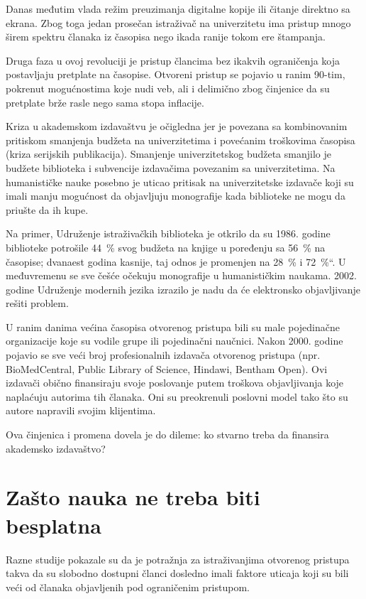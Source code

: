 \documentclass[12pt,a4paper]{article}
\begin{document}
   Danas međutim vlada režim preuzimanja digitalne kopije ili čitanje direktno sa ekrana. Zbog toga jedan prosečan istraživač na univerzitetu ima pristup mnogo širem spektru članaka iz časopisa nego ikada ranije tokom ere štampanja.
   
   Druga faza u ovoj revoluciji je pristup člancima bez ikakvih ograničenja koja postavljaju pretplate na časopise. Otvoreni pristup se pojavio u ranim 90-tim, pokrenut mogućnostima koje nudi veb, ali i delimično zbog činjenice da su pretplate brže rasle nego sama stopa inflacije. \cite{5}
   
   Kriza u akademskom izdavaštvu je očigledna jer je povezana sa kombinovanim pritiskom smanjenja budžeta na univerzitetima i povećanim troškovima časopisa (kriza serijskih publikacija). Smanjenje univerzitetskog budžeta smanjilo je budžete biblioteka i subvencije izdavačima povezanim sa univerzitetima. Na humanističke nauke posebno je uticao pritisak na univerzitetske izdavače koji su imali manju mogućnost da objavljuju monografije kada biblioteke ne mogu da priušte da ih kupe.
   
   Na primer, Udruženje istraživačkih biblioteka je otkrilo da su 1986. godine biblioteke potrošile \SI{44}{\percent} svog budžeta na knjige u poređenju sa  \SI{56}{\percent} na časopise; dvanaest godina kasnije, taj odnos je promenjen na  \SI{28}{\percent} i  \SI{72}{\percent}“. U međuvremenu se sve češće očekuju monografije u humanističkim naukama. 2002. godine Udruženje modernih jezika izrazilo je nadu da će elektronsko objavljivanje rešiti problem.
   
   U ranim danima većina časopisa otvorenog pristupa bili su male pojedinačne organizacije koje su vodile grupe ili pojedinačni naučnici. Nakon 2000. godine pojavio se sve veći broj profesionalnih izdavača otvorenog pristupa (npr. BioMedCentral, Public Library of Science, Hindawi, Bentham Open). Ovi izdavači obično finansiraju svoje poslovanje putem troškova objavljivanja koje naplaćuju autorima tih članaka. Oni su preokrenuli poslovni model tako što su autore napravili svojim klijentima. 
   
   Ova činjenica i promena dovela je do dileme: ko stvarno treba da finansira akademsko izdavaštvo? 



    \section{\large\textbf{Zašto nauka ne treba biti besplatna}}
    \indent
     Razne studije pokazale su da je potražnja za istraživanjima otvorenog pristupa takva da su slobodno dostupni članci dosledno imali faktore uticaja koji su bili veći od članaka objavljenih pod ograničenim pristupom.
  
\end{document}
